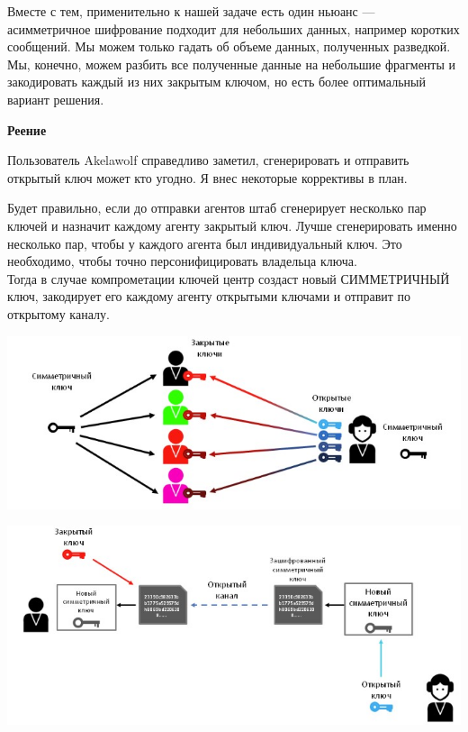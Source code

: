\documentclass[12pt]{article}
\begin{document}
	\vspace{0.5cm}
	
	Вместе с тем, применительно к нашей задаче есть один ньюанс — асимметричное шифрование подходит для небольших данных, например коротких сообщений. Мы можем только гадать об объеме данных, полученных разведкой. Мы, конечно, можем разбить все полученные данные на небольшие фрагменты и закодировать каждый из них закрытым ключом, но есть более оптимальный вариант решения.
	
	\textbf{Реение}
	
	Пользователь Akelawolf справедливо заметил, сгенерировать и отправить открытый ключ может кто угодно. Я внес некоторые коррективы в план.
	
	\vspace{0.5cm}
	
	Будет правильно, если до отправки агентов штаб сгенерирует несколько пар ключей и назначит каждому агенту закрытый ключ. Лучше сгенерировать именно несколько пар, чтобы у каждого агента был индивидуальный ключ. Это необходимо, чтобы точно персонифицировать владельца ключа.
	\\
	Тогда в случае компрометации ключей центр создаст новый СИММЕТРИЧНЫЙ ключ, закодирует его каждому агенту открытыми ключами и отправит по открытому каналу.
	
	\begin{center}
		\includegraphics[width=1\linewidth]{pictures/img5.jpg}
	\end{center}

\begin{center}
	\includegraphics[width=1\linewidth]{pictures/img6.jpg}
\end{center}
\end{document}
